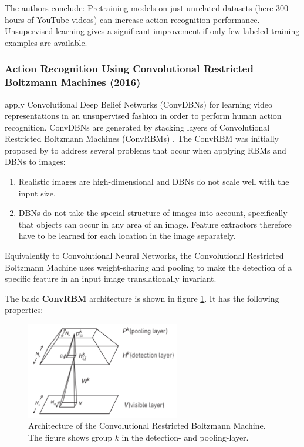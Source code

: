 The authors conclude: Pretraining models on just unrelated datasets (here 300 hours of YouTube videos) can increase action recognition performance.
Unsupervised learning gives a significant improvement if only few labeled training examples are available.


\subsubsection{Action Recognition Using Convolutional Restricted Boltzmann Machines (2016)}
\textcite{palasek_action_2016} apply Convolutional Deep Belief Networks (ConvDBNs) for learning video representations in an unsupervised fashion in order to perform human action recognition.
ConvDBNs are generated by stacking layers of Convolutional Restricted Boltzmann Machines (ConvRBMs) \cite{lee_convolutional_2009-1}.
The ConvRBM was initially proposed by \textcite{lee_convolutional_2009-1} to address several problems that occur when applying RBMs and DBNs to images:

\begin{enumerate}
    \item Realistic images are high-dimensional and DBNs do not scale well with the input size. \cite{lee_convolutional_2009-1} 
    \item DBNs do not take the special structure of images into account, specifically that objects can occur in any area of an image. Feature extractors therefore have to be learned for each location in the image separately. \cite{lee_convolutional_2009-1} 
\end{enumerate}

Equivalently to Convolutional Neural Networks, the Convolutional Restricted Boltzmann Machine uses weight-sharing and pooling to make the detection of a specific feature in an input image translationally invariant.

The basic \textbf{ConvRBM} architecture is shown in figure \ref{fig:convrbm_architecture}.
It has the following properties:\cite{lee_convolutional_2009-1}

\begin{figure}[H]
    \centering
    \includegraphics[width=0.6\textwidth]{img_deep/convrbm_architecture}
    \caption{Architecture of the Convolutional Restricted Boltzmann Machine. The figure shows group $k$ in the detection- and pooling-layer. \cite{lee_convolutional_2009-1}}
    \label{fig:convrbm_architecture}
\end{figure}

